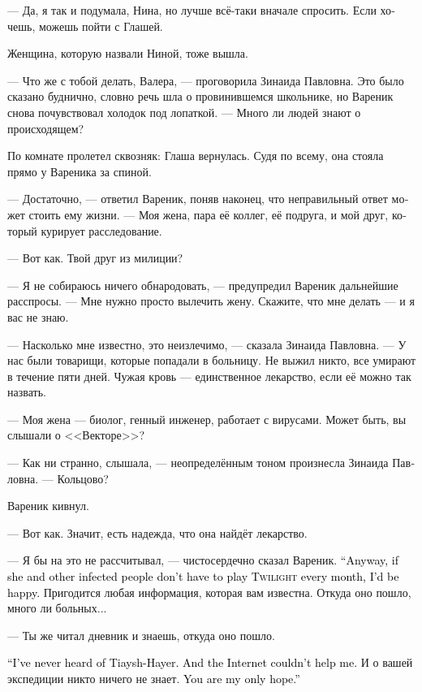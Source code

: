 \documentclass[a5paper,12pt,fleqn]{extbook}\usepackage{cooltooltips}\usepackage{polyglossia}\setdefaultlanguage[babelshorthands=true]{russian}\setotherlanguage{english}\defaultfontfeatures{Ligatures=TeX,Mapping=tex-text} \usepackage{xcolor}\definecolor{lightgray}{HTML}{bbbbbb}\color{lightgray}\newcommand{\ml}[3]{\textenglish{\textcolor{black}{#3}}}
\begin{document}
--- Да, я так и подумала, Нина, но лучше всё-таки вначале спросить.
Если хочешь, можешь пойти с Глашей.

Женщина, которую назвали Ниной, тоже вышла.

--- Что же с тобой делать, Валера, --- проговорила Зинаида Павловна.
Это было сказано буднично, словно речь шла о провинившемся школьнике, но Вареник снова почувствовал холодок под лопаткой.
--- Много ли людей знают о происходящем?

По комнате пролетел сквозняк: Глаша вернулась.
Судя по всему, она стояла прямо у Вареника за спиной.

--- Достаточно, --- ответил Вареник, поняв наконец, что неправильный ответ может стоить ему жизни.
--- Моя жена, пара её коллег, её подруга, и мой друг, который курирует расследование.

--- Вот как.
Твой друг из милиции?

--- Я не собираюсь ничего обнародовать, --- предупредил Вареник дальнейшие расспросы.
--- Мне нужно просто вылечить жену.
Скажите, что мне делать --- и я вас не знаю.

--- Насколько мне известно, это неизлечимо, --- сказала Зинаида Павловна.
--- У нас были товарищи, которые попадали в больницу.
Не выжил никто, все умирают в течение пяти дней.
Чужая кровь --- единственное лекарство, если её можно так назвать.

--- Моя жена --- биолог, генный инженер, работает с вирусами.
Может быть, вы слышали о <<Векторе>>?

--- Как ни странно, слышала, --- неопределённым тоном произнесла Зинаида Павловна.
--- Кольцово?

Вареник кивнул.

--- Вот как.
Значит, есть надежда, что она найдёт лекарство.

--- Я бы на это не рассчитывал, --- чистосердечно сказал Вареник.
\ml{$0$}
{--- Но если ей, и прочим заражённым, не придётся играть в <<Сумерки>> каждый месяц, я уже был бы рад.}
{``Anyway, if she and other infected people don't have to play \textsc{Twilight} every month, I'd be happy.}
Пригодится любая информация, которая вам известна.
Откуда оно пошло, много ли больных...

--- Ты же читал дневник и знаешь, откуда оно пошло.

\ml{$0$}
{--- Я ни разу не слышал о тяйшхаэрах.}
{``I've never heard of Tiaysh-Hayer.}
\ml{$0$}
{И Интернет мне в этом не помог.}
{And the Internet couldn't help me.}
И о вашей экспедиции никто ничего не знает.
\ml{$0$}
{Вся надежда на вас.}
{You are my only hope.''}
\end{document}
